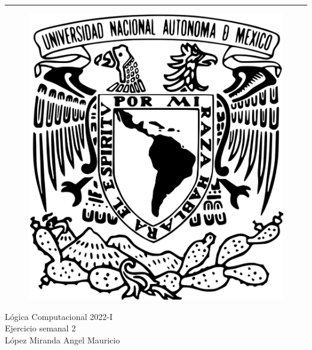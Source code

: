 \documentclass[a4paper]{article}
\begin{document}

\fancyhead[C]{}
\hrule \medskip %
\begin{minipage}{0.295\textwidth} 
\raggedright
\footnotesize
\begin{figure}[H]
    \includegraphics[scale = 0.053]{style/UNAM.png}
\end{figure}
\end{minipage}
\begin{minipage}{0.4\textwidth} 
\centering 
\large 
Lógica Computacional 2022-I\\ 
\normalsize 
Ejercicio semanal 2\\
\normalsize
López Miranda Angel Mauricio
\end{minipage}
\end{document}
